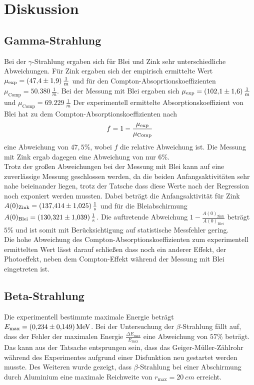 \section{Diskussion}
\subsection{Gamma-Strahlung}
Bei der $\gamma$-Strahlung ergaben sich für Blei und Zink sehr unterschiedliche Abweichungen.
Für Zink ergaben sich der empirisch ermittelte Wert $\mu_\text{exp} = \SI{47.4 \pm 1.9}{\frac{1}{m}}$ und für den Compton-Absoprtionskoeffizienten $\mu_\text{Comp} = \SI{50.380}{\frac{1}{m}}$.
Bei der Messung mit Blei ergaben sich $\mu_\text{exp} = \SI{102.1 \pm 1.6}{\frac{1}{m}}$ und $\mu_\text{Comp} = \SI{69.229}{\frac{1}{m}}$
Der experimentell ermittelte Absorptionskoeffizient von Blei hat zu dem Compton-Absorptionskoeffizienten nach
\begin{equation}
  f = 1 - \frac{\mu_\text{exp}}{\mu_\text{Comp}}  \notag
\end{equation}
eine Abweichung von $47,5\%$, wobei $f$ die relative Abweichung ist.
Die Messung mit Zink ergab dagegen eine Abweichung von nur $6 \%$.  \\
Trotz der großen Abweichungen bei der Messung mit Blei kann auf eine zuverlässige Messung geschlossen werden, da die beiden Anfangsaktivitäten sehr nahe beieinander liegen, trotz der Tatsche dass diese Werte nach der Regression noch exponiert werden mussten.
Dabei beträgt die Anfangsaktivität für Zink $A(0)_\text{Zink} = \SI{137.414 \pm 1.025}{\frac{1}{s}}$ und für die Bleiabschirmung $A(0)_\text{Blei} = \SI{130.321 \pm 1.039}{\frac{1}{s}}$.
Die auftretende Abweichung $1 - \frac{A(0)_\text{Zink}}{A(0)_\text{Blei}}$ beträgt $ 5\%$ und ist somit mit Berücksichtigung auf statistische Messfehler gering. \\
Die hohe Abweichung des Compton-Absorptionskoeffizienten zum experimentell ermittelten Wert lässt darauf schließen dass noch ein anderer Effekt, der Photoeffekt, neben dem Compton-Effekt während der Messung mit Blei eingetreten ist.
\subsection{Beta-Strahlung}
Die experimentell bestimmte maximale Energie beträgt $E_\text{max} = \SI{0.234 \pm 0.149}{MeV}$.
Bei der Untersuchung der $\beta$-Strahlung fällt auf, dass der Fehler der maximalen Energie $\frac{\Delta E_\text{max}}{E_\text{max}}$ eine Abweichung von $57\%$ beträgt.
Das kann aus der Tatsache entsprungen sein, dass das Geiger-Müller-Zählrohr während des Experimentes aufgrund einer Disfunktion neu gestartet werden musste.
Des Weiteren wurde gezeigt, dass $\beta$-Strahlung bei einer Abschirmung durch Aluminium eine maximale Reichweite von $r_\text{max} = \SI{20}{cm}$ erreicht.
